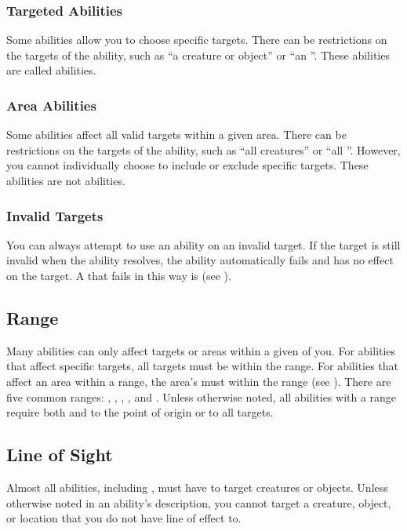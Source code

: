         \subsubsection{Targeted Abilities}\label{Targeted Abilities}
            Some abilities allow you to choose specific targets.
            There can be restrictions on the targets of the ability, such as ``a creature or object'' or ``an ''.
            These abilities are called  abilities.

        \subsubsection{Area Abilities}
            Some abilities affect all valid targets within a given area.
            There can be restrictions on the targets of the ability, such as ``all creatures'' or ``all ''.
            However, you cannot individually choose to include or exclude specific targets.
            These abilities are not  abilities.

        \subsubsection{Invalid Targets}
            You can always attempt to use an ability on an invalid target.
            If the target is still invalid when the ability resolves, the ability automatically fails and has no effect on the target.
            A  that fails in this way is  (see ).

    \subsection{Range}\label{Range}
        Many abilities can only affect targets or areas within a given  of you.
        For abilities that affect specific targets, all targets must be within the range.
        For abilities that affect an area within a range, the area's  must within the range (see ).
        There are five common ranges: \rngshort, \rngmed, \rnglong, \rngdist, and \rngext.
        Unless otherwise noted, all abilities with a range require both  and  to the point of origin or to all targets.

    \subsection{Line of Sight}\label{Line of Sight}
        Almost all abilities, including , must have  to target creatures or objects.
        Unless otherwise noted in an ability's description, you cannot target a creature, object, or location that you do not have line of effect to.

